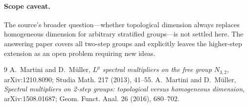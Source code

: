 \documentclass[10pt]{article}
\begin{document}
\paragraph{Scope caveat.}
The source's broader question---whether topological dimension always replaces
homogeneous dimension for arbitrary stratified groups---is not settled here.
The answering paper covers all two-step groups and explicitly leaves the
higher-step extension as an open problem requiring new ideas.

\begin{thebibliography}{9}
A.~Martini and D.~Müller,
\emph{$L^p$ spectral multipliers on the free group $N_{3,2}$},
arXiv:1210.8090; Studia Math. 217 (2013), 41--55.
A.~Martini and D.~Müller,
\emph{Spectral multipliers on 2-step groups: topological versus homogeneous
dimension}, arXiv:1508.01687; Geom. Funct. Anal. 26 (2016), 680--702.
\end{thebibliography}
\end{document}
